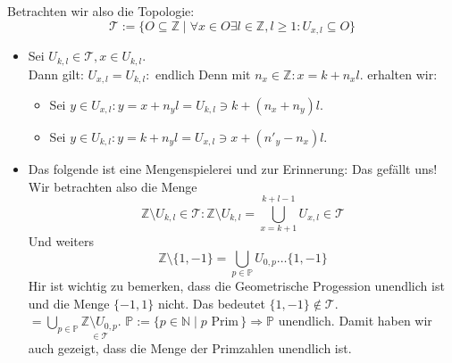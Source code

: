 Betrachten wir also die Topologie:
$$\mathcal{T} := \{ O \subseteq \mathbb{Z} \mid \forall x \in O \exists l \in \mathbb{Z}, l \ge 1 : U_{x,l} \subseteq O\}$$
\begin{itemize}
    \item Sei $U_{k,l} \in \mathcal{T}, x \in U_{k,l}$. \\
    Dann gilt: $U_{x,l}=U_{k,l} : \text{ endlich}$
    Denn mit $n_x \in \mathbb{Z}: x = k + n_x l$. erhalten wir: \\
    \begin{itemize}
        \item Sei $y \in U_{x,l}: y = x + n_y l = U_{k,l} \ni k + (n_x + n_y)l$.
        \item Sei $y \in U_{k,l}: y = k + n_y l = U_{x,l} \ni x + (n'_y - n_{x})l$.
    \end{itemize}

    \item Das folgende ist eine Mengenspielerei und zur Erinnerung: Das gefällt uns!\\
    Wir betrachten also die Menge $$\mathbb{Z} \setminus U_{k,l} \in \mathcal{T}: \mathbb{Z} \setminus U_{k,l} 
    = \underset{x= k+1}{\overset{k+l-1}{\bigcup}} U_{x,l} \in \mathcal{T}$$
    Und weiters 
    $$\mathbb{Z}\setminus\{1,-1\} = \underset{p \in \mathbb{P}}{\bigcup} U_{0,p} \dots \{1,-1\}$$
    Hir ist wichtig zu bemerken, dass die Geometrische Progession unendlich ist und die Menge $\{-1,1\}$ nicht. 
    Das bedeutet $\{1,-1\} \notin \mathcal{T}$.\\
    $= \underset{p \in \mathbb{P}}{\bigcup}\underset{\in \mathcal{T}}{\mathbb{Z}\setminus{U_{0,p}}}$. 
    $\mathbb{P}:= \{p \in \mathbb{N} \mid p \text{ Prim} \,\} \Rightarrow \mathbb{P} \text{ unendlich}$.
    Damit haben wir auch gezeigt, dass die Menge der Primzahlen unendlich ist.
    
\end{itemize}


